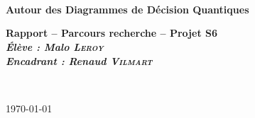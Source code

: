 \begin{center}

~\\[1cm]


\textsc{\Large }\\[0.5cm]

\HRule \\[0.4cm]

{\huge \bfseries Autour des Diagrammes de Décision Quantiques\\
[0.4cm] }

{\large \bfseries Rapport -- Parcours recherche -- Projet S6\\[0.4cm] }
{\large \bfseries \textsl{Élève : Malo \textsc{Leroy}}\\ }
{\large \bfseries \textsl{Encadrant : Renaud \textsc{Vilmart}}\\[0.4cm] }


\HRule \\[1.5cm]

\begingroup
\let\clearpage\relax
\tableofcontents
\endgroup

\vfill

{\large \today}

\end{center}